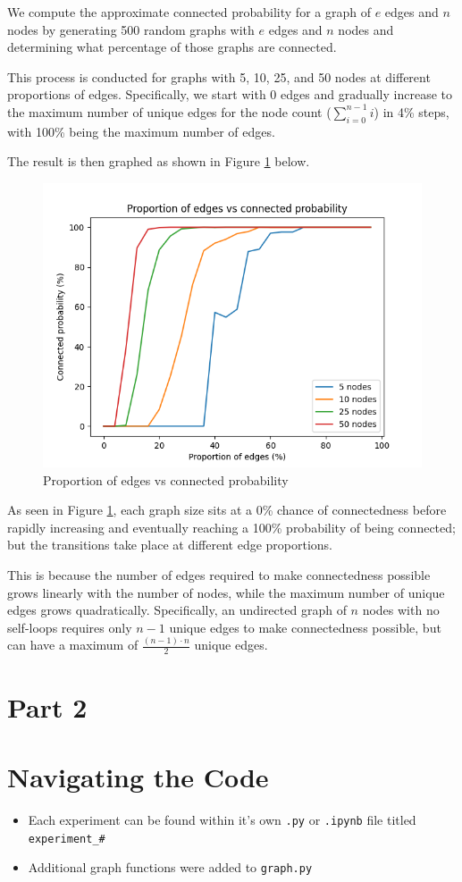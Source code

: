 \documentclass[titlepage]{article}
\begin{document}
We compute the approximate connected probability for a graph of $e$ edges and $n$ nodes by generating 500 random graphs with $e$ edges and $n$ nodes and determining what percentage of those graphs are connected.

This process is conducted for graphs with 5, 10, 25, and 50 nodes at different proportions of edges. Specifically, we start with 0 edges and gradually increase to the maximum number of unique edges for the node count ($\sum_{i=0}^{n-1}i$) in 4\% steps, with 100\% being the maximum number of edges.

The result is then graphed as shown in Figure \ref{fig:edges_vs_connected} below.

\begin{figure}[H]
    \centering
    \includegraphics[width=0.8\linewidth]{experiment_2.png}
    \caption{Proportion of edges vs connected probability}
    \label{fig:edges_vs_connected}
\end{figure}

As seen in Figure \ref{fig:edges_vs_connected}, each graph size sits at a 0\% chance of connectedness before rapidly increasing and eventually reaching a 100\% probability of being connected; but the transitions take place at different edge proportions.

This is because the number of edges required to make connectedness possible grows linearly with the number of nodes, while the maximum number of unique edges grows quadratically. Specifically, an undirected graph of $n$ nodes with no self-loops requires only $n - 1$ unique edges to make connectedness possible, but can have a maximum of $\frac{(n - 1) \cdot n}{2}$ unique edges.

\section{Part 2}



\appendix
\section{Navigating the Code}

\begin{itemize}
    \item Each experiment can be found within it's own \verb|.py| or \verb|.ipynb| file titled \verb|experiment_#|
    \item Additional graph functions were added to \verb|graph.py|
\end{itemize}
\end{document}
